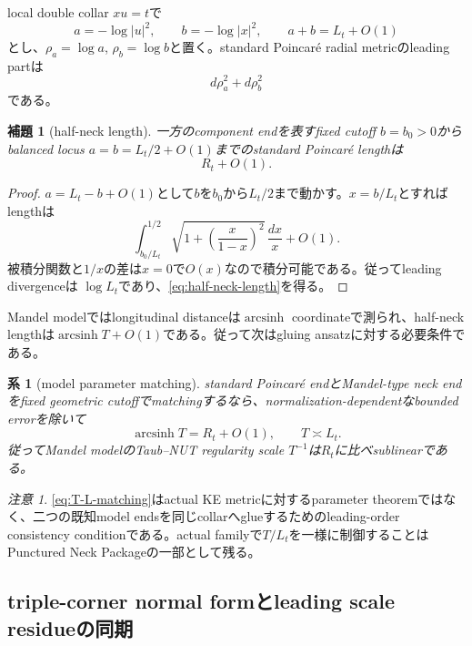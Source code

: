 \documentclass[11pt,a4paper]{ltjsarticle}
\newtheorem{lemma}[theorem]{補題}
\newtheorem{corollary}[theorem]{系}
\theoremstyle{definition}
\theoremstyle{remark}
\newtheorem{remark}[theorem]{注意}
\begin{document}
local double collar $xu=t$で
\[
 a=-\log|u|^2,\qquad b=-\log|x|^2,
 \qquad a+b=L_t+O(1)
\]
とし、$\rho_a=\log a$, $\rho_b=\log b$と置く。standard Poincaré radial metricのleading partは
\[
 d\rho_a^2+d\rho_b^2
\]
である。

\begin{lemma}[half-neck length]\label{lem:half-neck-length}
一方のcomponent endを表すfixed cutoff $b=b_0>0$からbalanced locus $a=b=L_t/2+O(1)$までのstandard Poincaré lengthは
\begin{equation}\label{eq:half-neck-length}
 R_t+O(1).
\end{equation}
\end{lemma}

\begin{proof}
$a=L_t-b+O(1)$として$b$を$b_0$から$L_t/2$まで動かす。$x=b/L_t$とすればlengthは
\[
 \int_{b_0/L_t}^{1/2}
 \sqrt{1+\left(\frac{x}{1-x}\right)^2}\,\frac{dx}{x}+O(1).
\]
被積分関数と$1/x$の差は$x=0$で$O(x)$なので積分可能である。従ってleading divergenceは
$\log L_t$であり、\eqref{eq:half-neck-length}を得る。
\end{proof}

Mandel modelではlongitudinal distanceは$\operatorname{arcsinh}$ coordinateで測られ、half-neck lengthは$\operatorname{arcsinh}T+O(1)$である\cite{Mandel}。従って次はgluing ansatzに対する必要条件である。

\begin{corollary}[model parameter matching]\label{cor:T-L-matching}
standard Poincaré endとMandel-type neck endをfixed geometric cutoffでmatchingするなら、normalization-dependentなbounded errorを除いて
\begin{equation}\label{eq:T-L-matching}
 \operatorname{arcsinh}T=R_t+O(1),
 \qquad T\asymp L_t.
\end{equation}
従ってMandel modelのTaub--NUT regularity scale $T^{-1}$は$R_t$に比べsublinearである。
\end{corollary}

\begin{remark}
\eqref{eq:T-L-matching}はactual KE metricに対するparameter theoremではなく、二つの既知model endsを同じcollarへglueするためのleading-order consistency conditionである。actual familyで$T/L_t$を一様に制御することはPunctured Neck Packageの一部として残る。
\end{remark}


\subsection{triple-corner normal formとleading scale residueの同期}
\label{subsec:toroidal-residue-synchronization}
\end{document}
